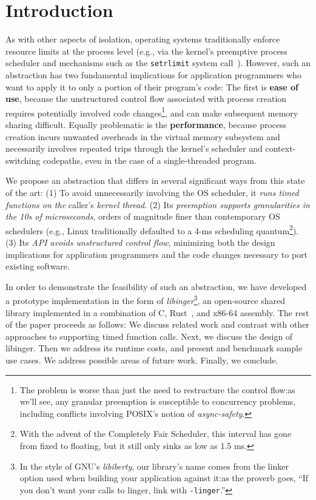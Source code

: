 \section{Introduction}

As with other aspects of isolation, operating systems traditionally enforce resource
limits at the process level (e.g., via the kernel's preemptive process scheduler and
mechanisms such as the \texttt{setrlimit} system call~\cite{setrlimit-manpage}).
However, such an abstraction has two fundamental implications for application
programmers who want to apply it to only a portion of their program's code:  The
first is \textbf{ease of use}, because the unstructured control flow associated with
process creation requires potentially involved code changes\footnote{The problem is
worse than just the need to restructure the control flow:\@ as we'll see, any
granular preemption is susceptible to concurrency problems, including conflicts
involving POSIX's notion of \textit{async-safety}.}, and can make subsequent
memory sharing difficult.  Equally problematic is the \textbf{performance}, because
process creation incurs unwanted overheads in the virtual memory subsystem and
necessarily involves repeated trips through the kernel's scheduler and
context-switching codepaths, even in the case of a single-threaded program.

We propose an abstraction that differs in several significant ways from this state of
the art:  (1) To avoid unnecessarily involving the OS scheduler, it \textit{runs
timed functions on the} caller's \textit{kernel thread}.  (2) Its \textit{preemption
supports granularities in the 10s of microseconds}, orders of magnitude finer than
contemporary OS schedulers (e.g., Linux traditionally defaulted to a 4-ms scheduling
quantum\footnote{With the advent of the Completely Fair Scheduler, this interval has
gone from fixed to floating, but it still only sinks as low as 1.5 ms.
}).  (3) Its \textit{API avoids
unstructured control flow}, minimizing both the design implications for application
programmers and the code changes necessary to port existing software.


In order to demonstrate the feasibility of such an abstraction, we have developed a
prototype implementation in the form of \textit{libinger}\footnote{In the style of
GNU's \textit{libiberty}, our library's name comes from the linker option used when
building your application against it:\@ as the proverb goes, ``If you don't want your
calls to linger, link with \texttt{-linger}.''}, an open-source shared library
implemented in a combination of C, Rust~\cite{www-rustlang}, and x86-64 assembly.
The rest of the paper proceeds as follows:  We discuss related work and contrast with
other approaches to supporting timed function calls.  Next, we discuss the design of
libinger.  Then we address its runtime costs, and present and benchmark sample use
cases.  We address possible areas of future work.  Finally, we conclude.


